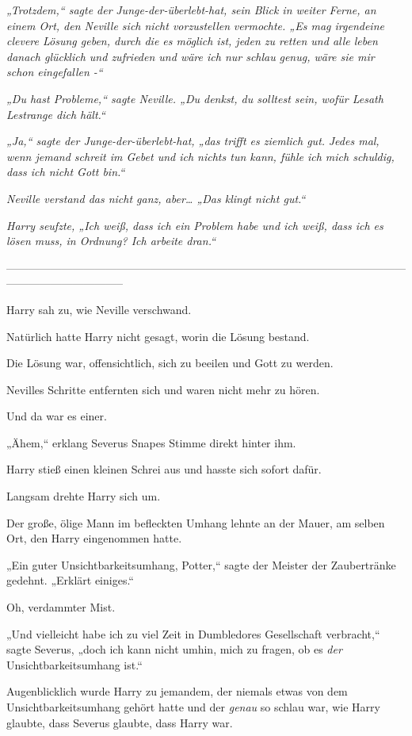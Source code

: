 {\emph{„Trotzdem,“ sagte der} \emph{Junge-der-überlebt-hat, sein Blick in weiter Ferne, an einem Ort, den Neville sich nicht vorzustellen} \emph{vermochte. „Es mag irgendeine clevere Lösung geben, durch die es möglich ist, jeden zu retten und alle leben danach glücklich und zufrieden und wäre ich nur schlau} \emph{genug, wäre sie mir schon eingefallen -“}

\emph{„Du hast Probleme,“ sagte Neville. „Du denkst, du solltest sein, wofür Lesath Lestrange dich hält.“}

\emph{„Ja,“ sagte der Junge-der-überlebt-hat, „das trifft es ziemlich gut.} \emph{Jedes mal, wenn jemand schreit im Gebet und ich nichts tun kann, fühle ich mich schuldig, dass ich nicht Gott bin.“}

\emph{Neville verstand das nicht ganz, aber… „Das klingt nicht gut.“}

\emph{Harry seufzte, „Ich weiß, dass ich ein Problem habe und ich weiß, dass ich es lösen muss, in Ordnung? Ich arbeite dran.“}

--------------------------------------------------------------------------------------------------------------------------------------------

Harry sah zu, wie Neville verschwand.

Natürlich hatte Harry nicht gesagt, worin die Lösung bestand.

Die Lösung war, offensichtlich, sich zu beeilen und Gott zu werden.

Nevilles Schritte entfernten sich und waren nicht mehr zu hören.

Und da war es einer.

„Ähem,“ erklang Severus Snapes Stimme direkt hinter ihm.

Harry stieß einen kleinen Schrei aus und hasste sich sofort dafür.

Langsam drehte Harry sich um.

Der große, ölige Mann im befleckten Umhang lehnte an der Mauer, am selben Ort, den Harry eingenommen hatte.

„Ein guter Unsichtbarkeitsumhang, Potter,“ sagte der Meister der Zaubertränke gedehnt. „Erklärt einiges.“

Oh, verdammter Mist.

„Und vielleicht habe ich zu viel Zeit in Dumbledores Gesellschaft verbracht,“ sagte Severus, „doch ich kann nicht umhin, mich zu fragen, ob es \emph{der} Unsichtbarkeitsumhang ist.“

Augenblicklich wurde Harry zu jemandem, der niemals etwas von dem Unsichtbarkeitsumhang gehört hatte und der \emph{genau} so schlau war, wie Harry glaubte, dass Severus glaubte, dass Harry war.

}
